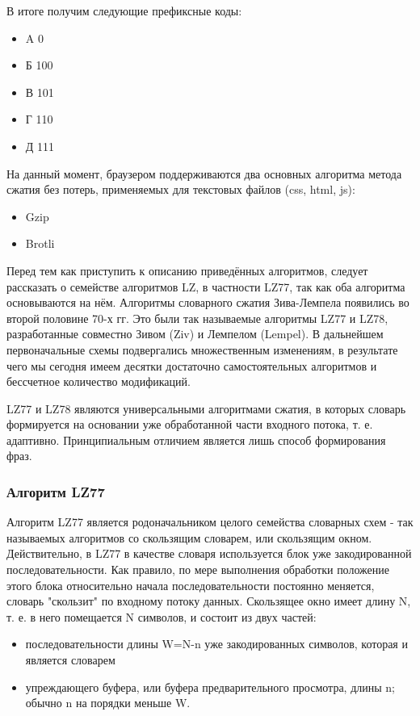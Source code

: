 \documentclass[12pt]{article}
\begin{document}
В итоге получим следующие префиксные коды:

\begin{itemize}
    \item A 0
    \item Б 100
    \item В 101
    \item Г 110
    \item Д 111
\end{itemize}

На данный момент, браузером поддерживаются два основных алгоритма метода сжатия без потерь, применяемых для текстовых файлов (css, html, js):

\begin{itemize}
    \item Gzip
    \item Brotli
\end{itemize}

Перед тем как приступить к описанию приведённых алгоритмов, следует рассказать
о семействе алгоритмов LZ, в частности LZ77, так как оба алгоритма основываются на нём.
Алгоритмы словарного сжатия Зива-Лемпела появились во второй половине 70-х гг.
Это были так называемые алгоритмы LZ77 и LZ78, разработанные совместно
Зивом (Ziv) и Лемпелом (Lempel). В дальнейшем первоначальные схемы подвергались множественным
изменениям, в результате чего мы сегодня имеем десятки достаточно самостоятельных алгоритмов
и бессчетное количество модификаций.

LZ77 и LZ78 являются универсальными алгоритмами сжатия,
в которых словарь формируется на основании уже обработанной части входного потока,
т. е. адаптивно. Принципиальным отличием является лишь способ формирования фраз.

\subsubsection{Алгоритм LZ77}

Алгоритм LZ77 является родоначальником целого семейства словарных схем - так называемых
алгоритмов со скользящим словарем, или скользящим окном. Действительно,
в LZ77 в качестве словаря используется блок уже закодированной последовательности.
Как правило, по мере выполнения обработки положение этого блока относительно начала
последовательности постоянно меняется, словарь "скользит" по входному потоку данных.
Скользящее окно имеет длину N, т. е. в него помещается N символов, и состоит из двух
частей:

\begin{itemize}
    \item последовательности длины W=N-n уже закодированных символов, которая и является словарем
    \item упреждающего буфера, или буфера предварительного просмотра,
          длины n; обычно n на порядки меньше W.
\end{itemize}
\end{document}
